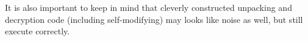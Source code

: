 







It is also important to keep in mind that 
cleverly constructed unpacking and decryption code 
(including self-modifying) may looks like noise as well, but still execute correctly.

